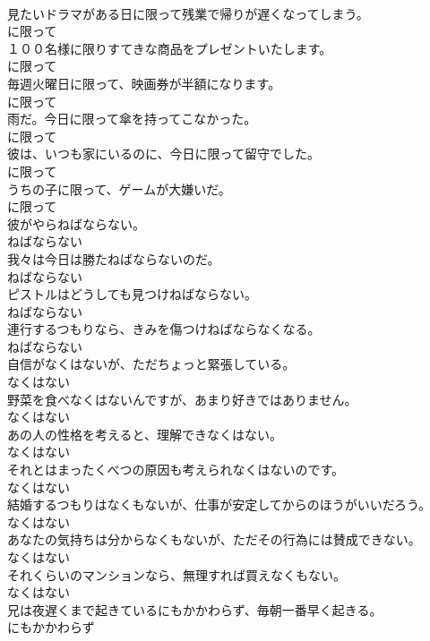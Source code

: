\documentclass[8pt]{extreport}
\begin{document}
\begin{CJK}{UTF8}{min}
\\	見たいドラマがある日に限って残業で帰りが遅くなってしまう。	
\\	に限って
\\	１００名様に限りすてきな商品をプレゼントいたします。	
\\	に限って
\\	毎週火曜日に限って、映画券が半額になります。	
\\	に限って
\\	雨だ。今日に限って傘を持ってこなかった。	
\\	に限って
\\	彼は、いつも家にいるのに、今日に限って留守でした。	
\\	に限って
\\	うちの子に限って、ゲームが大嫌いだ。	
\\	に限って
\\	彼がやらねばならない。	
\\	ねばならない
\\	我々は今日は勝たねばならないのだ。	
\\	ねばならない
\\	ピストルはどうしても見つけねばならない。	
\\	ねばならない
\\	連行するつもりなら、きみを傷つけねばならなくなる。	
\\	ねばならない
\\	自信がなくはないが、ただちょっと緊張している。	
\\	なくはない
\\	野菜を食べなくはないんですが、あまり好きではありません。	
\\	なくはない
\\	あの人の性格を考えると、理解できなくはない。	
\\	なくはない
\\	それとはまったくべつの原因も考えられなくはないのです。	
\\	なくはない
\\	結婚するつもりはなくもないが、仕事が安定してからのほうがいいだろう。	
\\	なくはない
\\	あなたの気持ちは分からなくもないが、ただその行為には賛成できない。	
\\	なくはない
\\	それくらいのマンションなら、無理すれば買えなくもない。	
\\	なくはない
\\	兄は夜遅くまで起きているにもかかわらず、毎朝一番早く起きる。	
\\	にもかかわらず

\end{CJK}
\end{document}
